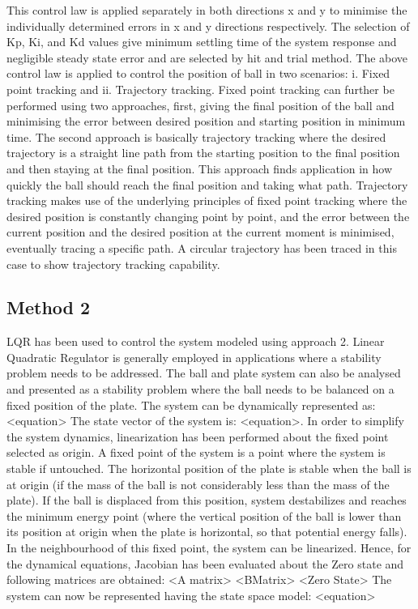 \documentclass[conference]{IEEEtran}
\begin{document}
This control law is applied separately in both directions x and y to minimise the individually determined errors in x and y directions respectively. The selection of Kp, Ki, and Kd values give minimum settling time of the system response and negligible steady state error and are selected by hit and trial method.
The above control law is applied to control the position of ball in two scenarios: i. Fixed point tracking and ii. Trajectory tracking.
Fixed point tracking can further be performed using two approaches, first, giving the final position of the ball and minimising the error between desired position and starting position in minimum time. The second approach is basically trajectory tracking where the desired trajectory is a straight line path from the starting position to the final position and then staying at the final position. This approach finds application in how quickly the ball should reach the final position and taking what path.
Trajectory tracking makes use of the underlying principles of fixed point tracking where the desired position is constantly changing point by point, and the error between the current position and the desired position at the current moment is minimised, eventually tracing a specific path. A circular trajectory has been traced in this case to show trajectory tracking capability.

\subsection{Method 2}
LQR has been used to control the system modeled using approach 2. Linear Quadratic Regulator is generally employed in applications where a stability problem needs to be addressed. The ball and plate system can also be analysed and presented as a stability problem where the ball needs to be balanced on a fixed position of the plate. The system can be dynamically represented as: <equation> The state vector of the system is: <equation>. In order to simplify the system dynamics, linearization has been performed about the fixed point selected as origin. A fixed point of the system is a point where the system is stable if untouched. The horizontal position of the plate is stable when the ball is at origin (if the mass of the ball is not considerably less than the mass of the plate). If the ball is displaced from this position, system destabilizes and reaches the minimum energy point (where the vertical position of the ball is lower than its position at origin when the plate is horizontal, so that potential energy falls). In the neighbourhood of this fixed point, the system can be linearized. Hence, for the dynamical equations, Jacobian has been evaluated about the Zero state and following matrices are obtained: <A matrix> <BMatrix> <Zero State>
The system can now be represented having the state space model: <equation>
\end{document}

